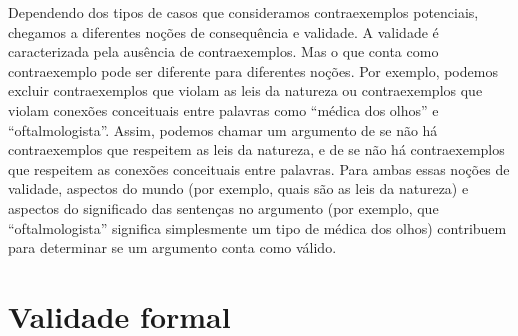Dependendo dos tipos de casos que consideramos contraexemplos potenciais, chegamos a diferentes noções de consequência e validade. A validade é caracterizada pela ausência de contraexemplos. Mas o que conta como contraexemplo pode ser diferente para diferentes noções. Por exemplo, podemos excluir contraexemplos que violam as leis da natureza ou contraexemplos que violam conexões conceituais entre palavras como \textquotedblleft médica dos olhos\textquotedblright{} e \textquotedblleft oftalmologista\textquotedblright{}. Assim, podemos chamar um argumento de  se não há contraexemplos que respeitem as leis da natureza, e de  se não há contraexemplos que respeitem as conexões conceituais entre palavras. Para ambas essas noções de validade, aspectos do mundo (por exemplo, quais são as leis da natureza) e aspectos do significado das sentenças no argumento (por exemplo, que \textquotedblleft oftalmologista\textquotedblright{} significa simplesmente um tipo de médica dos olhos) contribuem para determinar se um argumento conta como válido.

\section{Validade formal}\label{s:FormalValidity}

